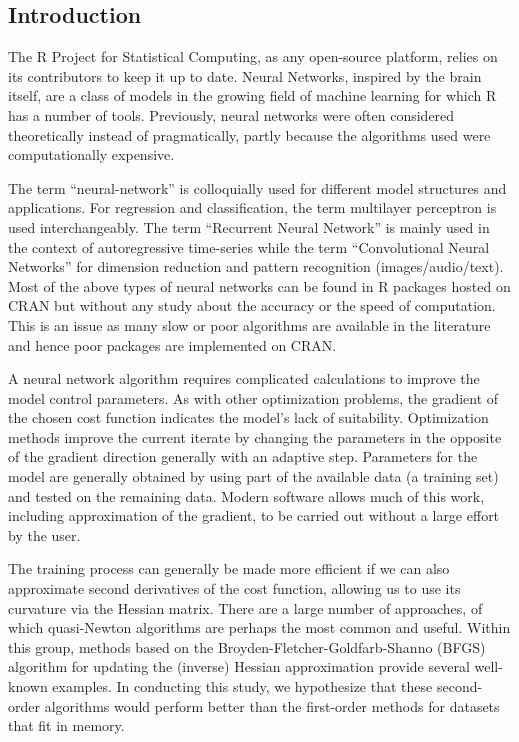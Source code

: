 \hypertarget{introduction}{%
\subsection{Introduction}\label{introduction}}

The R Project for Statistical Computing, as any open-source platform,
relies on its contributors to keep it up to date. Neural Networks,
inspired by the brain itself, are a class of models in the growing field
of machine learning for which R has a number of tools. Previously,
neural networks were often considered theoretically instead of
pragmatically, partly because the algorithms used were computationally
expensive.

The term ``neural-network'' is colloquially used for different model
structures and applications. For regression and classification, the term
multilayer perceptron is used interchangeably. The term ``Recurrent
Neural Network'' is mainly used in the context of autoregressive
time-series while the term ``Convolutional Neural Networks'' for
dimension reduction and pattern recognition (images/audio/text). Most of
the above types of neural networks can be found in R packages hosted on
CRAN but without any study about the accuracy or the speed of
computation. This is an issue as many slow or poor algorithms are
available in the literature and hence poor packages are implemented on
CRAN.

A neural network algorithm requires complicated calculations to improve
the model control parameters. As with other optimization problems, the
gradient of the chosen cost function indicates the model's lack of
suitability. Optimization methods improve the current iterate by
changing the parameters in the opposite of the gradient direction
generally with an adaptive step. Parameters for the model are generally
obtained by using part of the available data (a training set) and tested
on the remaining data. Modern software allows much of this work,
including approximation of the gradient, to be carried out without a
large effort by the user.

The training process can generally be made more efficient if we can also
approximate second derivatives of the cost function, allowing us to use
its curvature via the Hessian matrix. There are a large number of
approaches, of which quasi-Newton algorithms are perhaps the most common
and useful. Within this group, methods based on the
Broyden-Fletcher-Goldfarb-Shanno (BFGS) algorithm for updating the
(inverse) Hessian approximation provide several well-known examples. In
conducting this study, we hypothesize that these second-order algorithms
would perform better than the first-order methods for datasets that fit
in memory.

